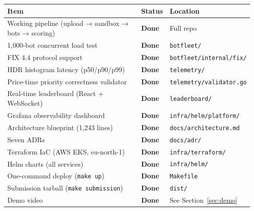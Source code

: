 \documentclass[12pt,a4paper]{article}
\begin{document}
\begin{center}
\begin{tabular}{L{7cm} C{2cm} L{4cm}}
  \toprule
  \textbf{Item} & \textbf{Status} & \textbf{Location} \\
  \midrule
  Working pipeline (upload → sandbox → bots → scoring) & \textcolor{checkgreen}{\textbf{Done}} & Full repo \\
  1{,}000-bot concurrent load test                      & \textcolor{checkgreen}{\textbf{Done}} & \texttt{botfleet/} \\
  FIX 4.4 protocol support                              & \textcolor{checkgreen}{\textbf{Done}} & \texttt{botfleet/internal/fix/} \\
  HDR histogram latency (p50/p90/p99)                   & \textcolor{checkgreen}{\textbf{Done}} & \texttt{telemetry/} \\
  Price-time priority correctness validator              & \textcolor{checkgreen}{\textbf{Done}} & \texttt{telemetry/validator.go} \\
  Real-time leaderboard (React + WebSocket)             & \textcolor{checkgreen}{\textbf{Done}} & \texttt{leaderboard/} \\
  Grafana observability dashboard                       & \textcolor{checkgreen}{\textbf{Done}} & \texttt{infra/helm/platform/} \\
  Architecture blueprint (1{,}243 lines)                & \textcolor{checkgreen}{\textbf{Done}} & \texttt{docs/architecture.md} \\
  Seven ADRs                                            & \textcolor{checkgreen}{\textbf{Done}} & \texttt{docs/adr/} \\
  Terraform IaC (AWS EKS, eu-north-1)                   & \textcolor{checkgreen}{\textbf{Done}} & \texttt{infra/terraform/} \\
  Helm charts (all services)                            & \textcolor{checkgreen}{\textbf{Done}} & \texttt{infra/helm/} \\
  One-command deploy (\texttt{make up})                 & \textcolor{checkgreen}{\textbf{Done}} & \texttt{Makefile} \\
  Submission tarball (\texttt{make submission})         & \textcolor{checkgreen}{\textbf{Done}} & \texttt{dist/} \\
  Demo video                                            & \textcolor{checkgreen}{\textbf{Done}} & See Section~\ref{sec:demo} \\
  \bottomrule
\end{tabular}
\end{center}
\end{document}
